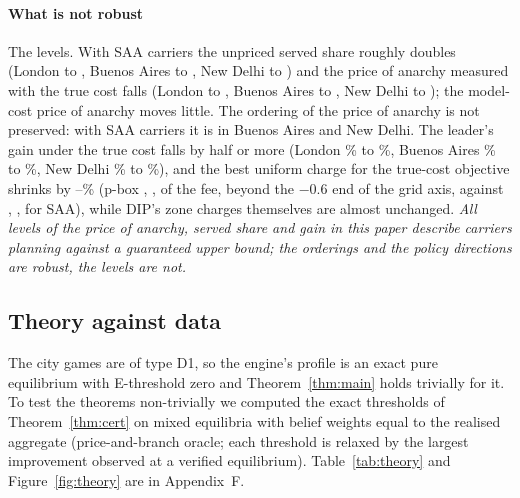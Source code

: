 \documentclass[preprint,12pt]{elsarticle}
\theoremstyle{definition}
\theoremstyle{remark}
\begin{document}
\paragraph{What is not robust} The levels. With SAA carriers the unpriced served share roughly doubles (London \CritPbServedLondon{} to \CritSaaServedLondon, Buenos Aires \CritPbServedBuenosAires{} to \CritSaaServedBuenosAires, New Delhi \CritPbServedNewDelhi{} to \CritSaaServedNewDelhi) and the price of anarchy measured with the true cost falls (London \CritPbPoaTrueLondon{} to \CritSaaPoaTrueLondon, Buenos Aires \CritPbPoaTrueBuenosAires{} to \CritSaaPoaTrueBuenosAires, New Delhi \CritPbPoaTrueNewDelhi{} to \CritSaaPoaTrueNewDelhi); the model-cost price of anarchy moves little. The ordering of the price of anarchy is not preserved: with SAA carriers it is \CritSaaBAND{} in Buenos Aires and New Delhi. The leader's gain under the true cost falls by half or more (London \CritPbDipTrueLondon\% to \CritSaaDipTrueLondon\%, Buenos Aires \CritPbDipTrueBuenosAires\% to \CritSaaDipTrueBuenosAires\%, New Delhi \CritPbDipTrueNewDelhi\% to \CritSaaDipTrueNewDelhi\%), and the best uniform charge for the true-cost objective shrinks by \CritChargeDropMin--\CritChargeDropMax\% (p-box \CritPbChargeLondon, \CritPbChargeBuenosAires, \CritPbChargeNewDelhi{} of the fee, beyond the $-0.6$ end of the grid axis, against \CritSaaChargeLondon, \CritSaaChargeBuenosAires, \CritSaaChargeNewDelhi{} for SAA), while DIP's zone charges themselves are almost unchanged. \emph{All levels of the price of anarchy, served share and gain in this paper describe carriers planning against a guaranteed upper bound; the orderings and the policy directions are robust, the levels are not.}

\subsection{Theory against data}\label{sec:res-theory}

The city games are of type D1, so the engine's profile is an exact pure equilibrium with E-threshold zero and Theorem~\ref{thm:main} holds trivially for it. To test the theorems non-trivially we computed the exact thresholds of Theorem~\ref{thm:cert} on mixed equilibria with belief weights equal to the realised aggregate (price-and-branch oracle; each threshold is relaxed by the largest improvement observed at a verified equilibrium). Table~\ref{tab:theory} and Figure~\ref{fig:theory} are in Appendix~F.
\end{document}
